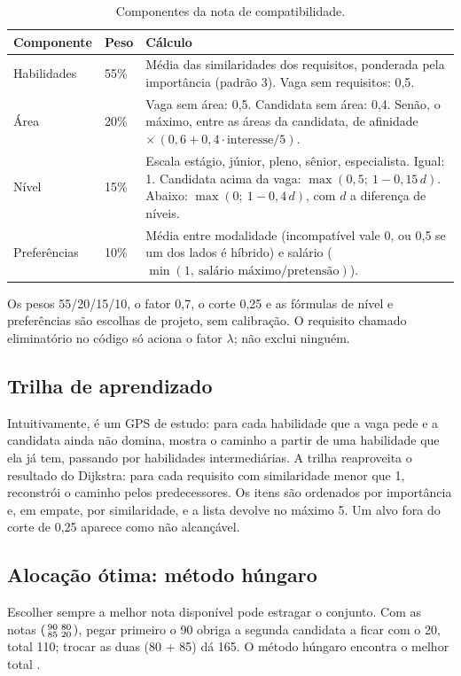 \documentclass[12pt]{article}
\begin{document}
\begin{table}[ht]
\centering
\caption{Componentes da nota de compatibilidade.}
\label{tab:comp}
\begin{tabular}{p{2.5cm}p{1.1cm}p{10.2cm}}
\hline
Componente & Peso & Cálculo \\
\hline
Habilidades & 55\% & Média das similaridades dos requisitos, ponderada pela importância (padrão 3). Vaga sem requisitos: 0,5. \\
Área & 20\% & Vaga sem área: 0,5. Candidata sem área: 0,4. Senão, o máximo, entre as áreas da candidata, de afinidade $\times\,(0{,}6 + 0{,}4 \cdot \text{interesse}/5)$. \\
Nível & 15\% & Escala estágio, júnior, pleno, sênior, especialista. Igual: 1. Candidata acima da vaga: $\max(0{,}5;\ 1 - 0{,}15\,d)$. Abaixo: $\max(0;\ 1 - 0{,}4\,d)$, com $d$ a diferença de níveis. \\
Preferências & 10\% & Média entre modalidade (incompatível vale 0, ou 0,5 se um dos lados é híbrido) e salário ($\min(1,\ \text{salário máximo}/\text{pretensão})$). \\
\hline
\end{tabular}
\end{table}

Os pesos 55/20/15/10, o fator 0,7, o corte 0,25 e as fórmulas de nível e preferências são escolhas de projeto, sem calibração. O requisito chamado eliminatório no código só aciona o fator $\lambda$; não exclui ninguém.

\subsection{Trilha de aprendizado}

Intuitivamente, é um GPS de estudo: para cada habilidade que a vaga pede e a candidata ainda não domina, mostra o caminho a partir de uma habilidade que ela já tem, passando por habilidades intermediárias. A trilha reaproveita o resultado do Dijkstra: para cada requisito com similaridade menor que 1, reconstrói o caminho pelos predecessores. Os itens são ordenados por importância e, em empate, por similaridade, e a lista devolve no máximo 5. Um alvo fora do corte de 0,25 aparece como não alcançável.

\subsection{Alocação ótima: método húngaro}

Escolher sempre a melhor nota disponível pode estragar o conjunto. Com as notas $\begin{psmallmatrix}90 & 80\\ 85 & 20\end{psmallmatrix}$, pegar primeiro o 90 obriga a segunda candidata a ficar com o 20, total 110; trocar as duas (80 + 85) dá 165. O método húngaro encontra o melhor total \cite{kuhn1955,munkres1957}.
\end{document}
